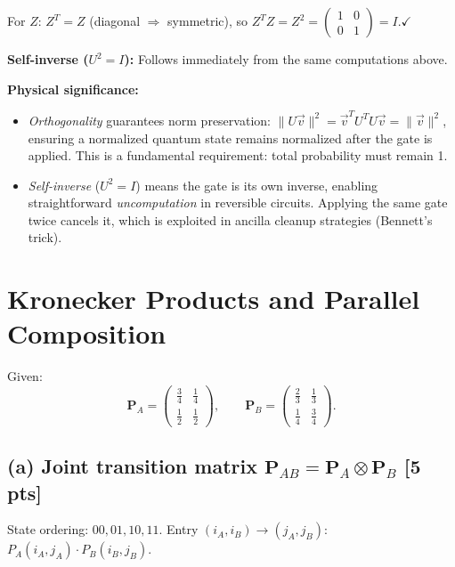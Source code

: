 \documentclass[11pt,a4paper]{article}
\begin{document}
For $Z$: $Z^T=Z$ (diagonal $\Rightarrow$ symmetric), so $Z^TZ=Z^2=\begin{pmatrix}1&0\\0&1\end{pmatrix}=I$.\;$\checkmark$

\textbf{Self-inverse ($U^2=I$):} Follows immediately from the same computations above.

\textbf{Physical significance:}
\begin{itemize}
  \item \emph{Orthogonality} guarantees norm preservation: $\|U\vec{v}\|^2=\vec{v}^TU^TU\vec{v}=\|\vec{v}\|^2$,
    ensuring a normalized quantum state remains normalized after the gate is applied.
    This is a fundamental requirement: total probability must remain 1.
  \item \emph{Self-inverse} ($U^2=I$) means the gate is its own inverse, enabling straightforward
    \emph{uncomputation} in reversible circuits. Applying the same gate twice cancels it,
    which is exploited in ancilla cleanup strategies (Bennett's trick).
\end{itemize}

\newpage
\section{Kronecker Products and Parallel Composition}

Given:
\[
\mathbf{P}_A=\begin{pmatrix}\tfrac34&\tfrac14\\[4pt]\tfrac12&\tfrac12\end{pmatrix},\qquad
\mathbf{P}_B=\begin{pmatrix}\tfrac23&\tfrac13\\[4pt]\tfrac14&\tfrac34\end{pmatrix}.
\]

\subsection*{(a) Joint transition matrix $\mathbf{P}_{AB}=\mathbf{P}_A\otimes\mathbf{P}_B$ [5 pts]}

State ordering: $00,01,10,11$. Entry $(i_A,i_B)\to(j_A,j_B)$: $P_A(i_A,j_A)\cdot P_B(i_B,j_B)$.
\end{document}
